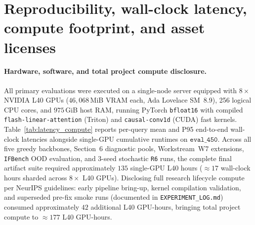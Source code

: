 \documentclass{article}
\begin{document}
\section{Reproducibility, wall-clock latency, compute footprint, and asset licenses}
\label{app:repro}

\paragraph{Hardware, software, and total project compute disclosure.}
All primary evaluations were executed on a single-node server equipped with $8\times$ NVIDIA L40 GPUs ($46{,}068$\,MiB VRAM each, Ada Lovelace SM~8.9), 256 logical CPU cores, and $975$\,GiB host RAM, running PyTorch \texttt{bfloat16} with compiled \texttt{flash-linear-attention} (Triton) and \texttt{causal-conv1d} (CUDA) fast kernels. Table~\ref{tab:latency_compute} reports per-query mean and P95 end-to-end wall-clock latencies alongside single-GPU cumulative runtimes on $\texttt{eval\_450}$. Across all five greedy backbones, Section~6 diagnostic pools, Workstream~W7 extensions, \texttt{IFBench} OOD evaluation, and 3-seed stochastic \texttt{R6} runs, the complete final artifact suite required approximately $135$ single-GPU L40 hours ($\approx 17$ wall-clock hours sharded across $8\times$ L40 GPUs). Disclosing full research lifecycle compute per NeurIPS guidelines: early pipeline bring-up, kernel compilation validation, and superseded pre-fix smoke runs (documented in \texttt{EXPERIMENT\_LOG.md}) consumed approximately $42$ additional L40 GPU-hours, bringing total project compute to $\approx 177$ L40 GPU-hours.
\end{document}
